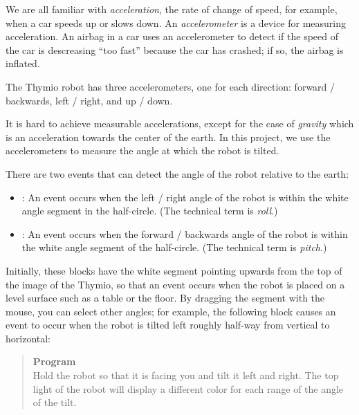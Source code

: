 
\label{ch.angles}

We are all familiar with \emph{acceleration}, the rate of change of
speed, for example, when a car speeds up or slows down. An
\emph{accelerometer} is a device for measuring acceleration. An airbag
in a car uses an accelerometer to detect if the speed of the car is
descreasing ``too fast'' because the car has crashed; if so, the airbag
is inflated.

The Thymio robot has three accelerometers, one for each direction:
forward / backwards, left / right, and up / down.


It is hard to achieve measurable accelerations, except for the case of
\emph{gravity} which is an acceleration towards the center of the earth.
In this project, we use the accelerometers to measure the angle at which
the robot is tilted.

There are two events that can detect the angle of the robot relative to
the earth: \label{p.accel}

\begin{itemize}

\item {}: An event occurs when the left / right angle of
the robot is within the white angle segment in the half-circle. (The
technical term is \emph{roll}.)

\item {}: An event occurs when the forward /
backwards angle of the robot is within the white angle segment of the
half-circle. (The technical term is \emph{pitch}.)

\end{itemize}

Initially, these blocks have the white segment pointing upwards from the
top of the image of the Thymio, so that an event occurs when the robot
is placed on a level surface such as a table or the floor. By dragging
the segment with the mouse, you can select other angles; for
example, the following block causes an event to occur when the robot is
tilted left roughly half-way from vertical to horizontal:


\begin{quote}
\textbf{Program}\\
Hold the robot so that it is facing you and tilt it left and right. The
top light of the robot will display a different color for each range
of the angle of the tilt.
\end{quote}


